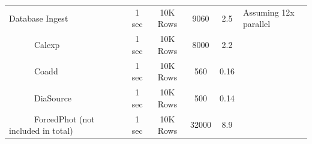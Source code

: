 \documentclass[prd, nofootinbib, floatfix, 11pt,tightenlines,times]{article}
\begin{document}
\begin{table}
\begin{center}
\begin{tabular}{lccccl}
\hline
Database Ingest               & 1 sec      & 10K Rows     & 9060     & 2.5     & Assuming 12x parallel  \\
~~~~~~Calexp                  & 1 sec      & 10K Rows     & 8000     & 2.2     &  \\
~~~~~~Coadd                   & 1 sec      & 10K Rows     & 560      & 0.16    &  \\
~~~~~~DiaSource               & 1 sec      & 10K Rows     & 500      & 0.14    &  \\
~~~~~~ForcedPhot (not included in total)& 1 sec      & 10K Rows      & 32000   & 8.9    &  \\
\hline
\hline
\end{tabular}
\end{center}
\end{table}
\end{document}

